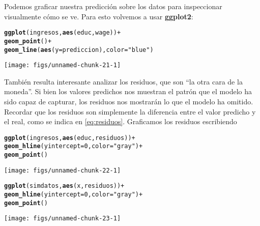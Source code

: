 \documentclass{report}\usepackage[]{graphicx}\usepackage[]{color}
\makeatletter
\newcommand{\hlnum}[1]{\textcolor[rgb]{0.686,0.059,0.569}{#1}}%
\newcommand{\hlstr}[1]{\textcolor[rgb]{0.192,0.494,0.8}{#1}}%
\newcommand{\hlopt}[1]{\textcolor[rgb]{0,0,0}{#1}}%
\newcommand{\hlstd}[1]{\textcolor[rgb]{0.345,0.345,0.345}{#1}}%
\newcommand{\hlkwc}[1]{\textcolor[rgb]{0.333,0.667,0.333}{#1}}%
\newcommand{\hlkwd}[1]{\textcolor[rgb]{0.737,0.353,0.396}{\textbf{#1}}}%
\newenvironment{kframe}{%
 \def\at@end@of@kframe{}%
 \ifinner\ifhmode%
  \def\at@end@of@kframe{\end{minipage}}%
  \begin{minipage}{\columnwidth}%
 \fi\fi%
 \def\FrameCommand##1{\hskip\@totalleftmargin \hskip-\fboxsep
 \colorbox{shadecolor}{##1}\hskip-\fboxsep
     \hskip-\linewidth \hskip-\@totalleftmargin \hskip\columnwidth}%
 \MakeFramed {\advance\hsize-\width
   \@totalleftmargin\z@ \linewidth\hsize
   \@setminipage}}%
 {\par\unskip\endMakeFramed%
 \at@end@of@kframe}
\newenvironment{knitrout}{}{} %
\newcommand*{\paq}[1]{\textbf{#1}\index{#1@\textbf{#1}}}
\makeatother
\begin{document}
Podemos graficar nuestra predicción sobre los datos para inspeccionar visualmente cómo se ve. Para esto volvemos a usar \paq{ggplot2}:
\begin{knitrout}
\color{fgcolor}\begin{kframe}
\begin{alltt}
\hlkwd{ggplot}\hlstd{(ingresos,} \hlkwd{aes}\hlstd{(educ, wage))} \hlopt{+}
  \hlkwd{geom_point}\hlstd{()} \hlopt{+}
  \hlkwd{geom_line}\hlstd{(}\hlkwd{aes}\hlstd{(}\hlkwc{y} \hlstd{= prediccion),} \hlkwc{color} \hlstd{=} \hlstr{"blue"}\hlstd{)}
\end{alltt}
\end{kframe}

{\centering \texttt{[image: figs/unnamed-chunk-21-1]} 

}



\end{knitrout}

También resulta interesante analizar los residuos, que son ``la otra cara de la moneda''. Si bien los valores predichos nos muestran el patrón que el modelo ha sido capaz de capturar, los residuos nos mostrarán lo que el modelo ha omitido. Recordar que los residuos son simplemente la diferencia entre el valor predicho y el real, como se indica en \eqref{eq:residuos}. Graficamos los residuos escribiendo

\begin{knitrout}
\color{fgcolor}\begin{kframe}
\begin{alltt}
\hlkwd{ggplot}\hlstd{(ingresos,} \hlkwd{aes}\hlstd{(educ, residuos))} \hlopt{+}
  \hlkwd{geom_hline}\hlstd{(}\hlkwc{yintercept} \hlstd{=} \hlnum{0}\hlstd{,} \hlkwc{color} \hlstd{=} \hlstr{"gray"}\hlstd{)} \hlopt{+}
  \hlkwd{geom_point}\hlstd{()}
\end{alltt}
\end{kframe}

{\centering \texttt{[image: figs/unnamed-chunk-22-1]} 

}



\end{knitrout}

\begin{knitrout}
\color{fgcolor}\begin{kframe}
\begin{alltt}
\hlkwd{ggplot}\hlstd{(simdatos,} \hlkwd{aes}\hlstd{(x, residuos))} \hlopt{+}
  \hlkwd{geom_hline}\hlstd{(}\hlkwc{yintercept} \hlstd{=} \hlnum{0}\hlstd{,} \hlkwc{color} \hlstd{=} \hlstr{"gray"}\hlstd{)} \hlopt{+}
  \hlkwd{geom_point}\hlstd{()}
\end{alltt}
\end{kframe}

{\centering \texttt{[image: figs/unnamed-chunk-23-1]} 

}



\end{knitrout}
\end{document}
